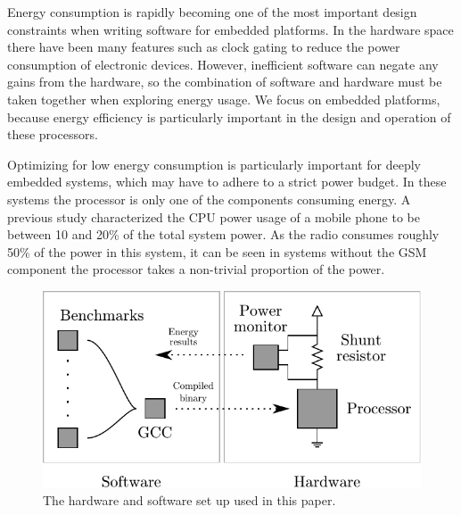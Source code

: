 \documentclass[twocolumn]{article}
\let\oldcaption\caption
\renewcommand{\caption}[1]{\oldcaption{\textup{#1}}}
\begin{document}
Energy consumption is rapidly becoming one of the most important design constraints when writing software for embedded platforms. In the hardware space there have been many features such as clock gating to reduce the power consumption of electronic devices. However, inefficient software can negate any gains from the hardware, so the combination of software and hardware must be taken together when exploring energy usage. We focus on embedded platforms, because energy efficiency is particularly important in the design and operation of these processors.

Optimizing for low energy consumption is particularly important for deeply embedded systems, which may have to adhere to a strict power budget. In these systems the processor is only one of the components consuming energy. A previous study characterized the CPU power usage of a mobile phone to be between 10 and 20\% of the total system power\cite{SmartPhonePower}. As the radio consumes roughly 50\% of the power in this system, it can be seen in systems without the GSM component the processor takes a non-trivial proportion of the power.

\begin{figure}[b!]
	\includegraphics[width=\linewidth]{diagram.pdf}
	\caption{The hardware and software set up used in this paper.}
	\label{Fig:setup}
\end{figure}
\end{document}
